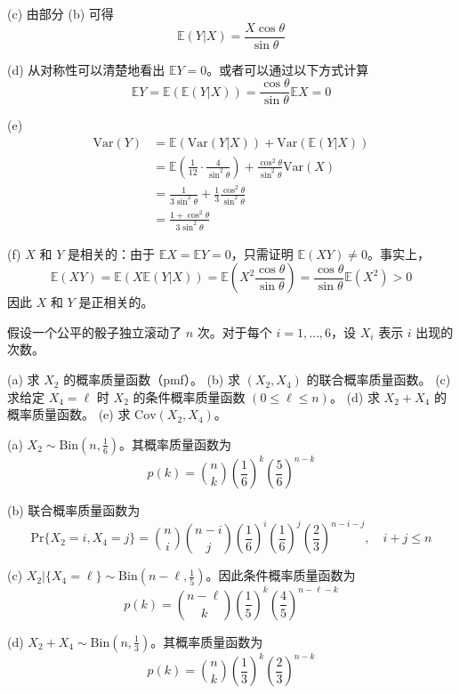 \begin{questions}
\begin{solution}
(c) 由部分 (b) 可得
\[
\mathbb{E}(Y|X) = \frac{X \cos \theta}{\sin \theta}
\]

(d) 从对称性可以清楚地看出 $\mathbb{E}Y = 0$。或者可以通过以下方式计算
\[
\mathbb{E}Y = \mathbb{E}(\mathbb{E}(Y|X)) = \frac{\cos \theta}{\sin \theta} \mathbb{E}X = 0
\]

(e) 
\begin{align*}
\text{Var}(Y) &= \mathbb{E}(\text{Var}(Y|X)) + \text{Var}(\mathbb{E}(Y|X)) \\
&= \mathbb{E}\left( \frac{1}{12} \cdot \frac{4}{\sin^2 \theta} \right) + \frac{\cos^2 \theta}{\sin^2 \theta} \text{Var} (X) \\
&= \frac{1}{3 \sin^2 \theta} + \frac{1}{3} \frac{\cos^2 \theta}{\sin^2 \theta} \\
&= \frac{1 + \cos^2 \theta}{3 \sin^2 \theta}
\end{align*}

(f) $X$ 和 $Y$ 是相关的：由于 $\mathbb{E}X = \mathbb{E}Y = 0$，只需证明 $\mathbb{E}(XY) \neq 0$。事实上，
\[
\mathbb{E}(XY) = \mathbb{E}(X \mathbb{E}(Y|X)) = \mathbb{E}\left( X^2 \frac{\cos \theta}{\sin \theta} \right) = \frac{\cos \theta}{\sin \theta} \mathbb{E}(X^2) > 0
\]
因此 $X$ 和 $Y$ 是正相关的。
\end{solution}

\question
假设一个公平的骰子独立滚动了 $n$ 次。对于每个 $i = 1, \dots, 6$，设 $X_i$ 表示 $i$ 出现的次数。

(a) 求 $X_2$ 的概率质量函数（pmf）。
(b) 求 $(X_2, X_4)$ 的联合概率质量函数。
(c) 求给定 $X_4 = \ell$ 时 $X_2$ 的条件概率质量函数 $(0 \leq \ell \leq n)$。
(d) 求 $X_2 + X_4$ 的概率质量函数。
(e) 求 $\text{Cov}(X_2, X_4)$。

\begin{solution}
(a) $X_2 \sim \text{Bin}(n, \frac{1}{6})$。其概率质量函数为
\[
p(k) = \binom{n}{k} \left( \frac{1}{6} \right)^k \left( \frac{5}{6} \right)^{n-k}
\]

(b) 联合概率质量函数为
\[
\text{Pr}\{X_2 = i, X_4 = j\} = \binom{n}{i} \binom{n-i}{j} \left( \frac{1}{6} \right)^i \left( \frac{1}{6} \right)^j \left( \frac{2}{3} \right)^{n-i-j}, \quad i+j \leq n
\]

(c) $X_2 | \{X_4 = \ell\} \sim \text{Bin}(n - \ell, \frac{1}{5})$。因此条件概率质量函数为
\[
p(k) = \binom{n - \ell}{k} \left( \frac{1}{5} \right)^k \left( \frac{4}{5} \right)^{n-\ell-k}
\]

(d) $X_2 + X_4 \sim \text{Bin}(n, \frac{1}{3})$。其概率质量函数为
\[
p(k) = \binom{n}{k} \left( \frac{1}{3} \right)^k \left( \frac{2}{3} \right)^{n-k}
\]


\end{solution}
\end{questions}
